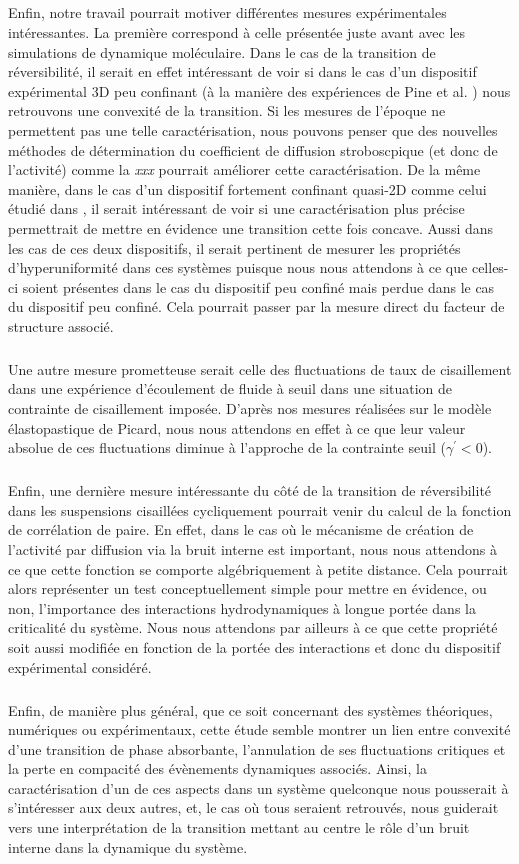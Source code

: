 \subparagraph{}Enfin, notre travail pourrait motiver différentes mesures expérimentales intéressantes. La première correspond à celle présentée juste avant avec les simulations de dynamique moléculaire. Dans le cas de la transition de réversibilité, il serait en effet intéressant de voir si dans le cas d'un dispositif expérimental 3D peu confinant (à la manière des expériences de Pine et al. \cite{pine_chaos_2005}) nous retrouvons une convexité de la transition. Si les mesures de l'époque ne permettent pas une telle caractérisation, nous pouvons penser que des nouvelles méthodes de détermination du coefficient de diffusion stroboscpique (et donc de l'activité) comme la \textit{xxx} pourrait améliorer cette caractérisation. De la même manière, dans le cas d'un dispositif fortement confinant quasi-2D comme celui étudié dans \cite{jeanneret_geometrically_2014, weijs_emergent_2015}, il serait intéressant de voir si une caractérisation plus précise permettrait de mettre en évidence une transition cette fois concave. Aussi dans les cas de ces deux dispositifs, il serait pertinent de mesurer les propriétés d'hyperuniformité dans ces systèmes puisque nous nous attendons à ce que celles-ci soient présentes dans le cas du dispositif peu confiné mais perdue dans le cas du dispositif peu confiné. Cela pourrait passer par la mesure direct du facteur de structure associé.

\subparagraph{}Une autre mesure prometteuse serait celle des fluctuations de taux de cisaillement dans une expérience d'écoulement de fluide à seuil dans une situation de contrainte de cisaillement imposée. D'après nos mesures réalisées sur le modèle élastopastique de Picard, nous nous attendons en effet à ce que leur valeur absolue de ces fluctuations diminue à l'approche de la contrainte seuil ($\gamma^\prime < 0$).

\subparagraph{}Enfin, une dernière mesure intéressante du côté de la transition de réversibilité dans les suspensions cisaillées cycliquement pourrait venir du calcul de la fonction de corrélation de paire. En effet, dans le cas où le mécanisme de création de l'activité par diffusion via la bruit interne est important, nous nous attendons à ce que cette fonction se comporte algébriquement à petite distance. Cela pourrait alors représenter un test conceptuellement simple pour mettre en évidence, ou non, l'importance des interactions hydrodynamiques à longue portée dans la criticalité du système. Nous nous attendons par ailleurs à ce que cette propriété soit aussi modifiée en fonction de la portée des interactions et donc du dispositif expérimental considéré.

\subparagraph{}Enfin, de manière plus général, que ce soit concernant des systèmes théoriques, numériques ou expérimentaux, cette étude semble montrer un lien entre convexité d'une transition de phase absorbante, l'annulation de ses fluctuations critiques et la perte en compacité des évènements dynamiques associés. Ainsi, la caractérisation d'un de ces aspects dans un système quelconque nous pousserait à s'intéresser aux deux autres, et, le cas où tous seraient retrouvés, nous guiderait vers une interprétation de la transition mettant au centre le rôle d'un bruit interne dans la dynamique du système.

